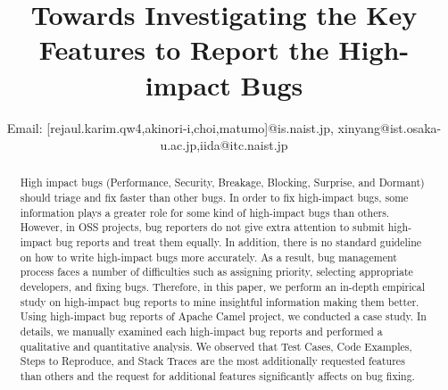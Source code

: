 \documentclass[conference]{IEEEtran}
\begin{document}
\title{Towards Investigating the Key Features to Report the High-impact Bugs }


\author{


Email: [rejaul.karim.qw4,akinori-i,choi,matumo]@is.naist.jp, xinyang@ist.osaka-u.ac.jp,iida@itc.naist.jp
}

\maketitle
\begin{abstract}

High impact bugs (Performance, Security, Breakage, Blocking, Surprise, and Dormant) should triage and fix faster than other bugs. In order to fix high-impact bugs, some information plays a greater role for some kind of high-impact bugs than others. However, in OSS projects, bug reporters do not give extra attention to submit high-impact bug reports and treat them equally. In addition,  there is no standard guideline on how to write high-impact bugs more accurately. As a result, bug management process faces a number of difficulties such as assigning priority, selecting appropriate developers, and fixing bugs. Therefore, in this paper, we perform an in-depth empirical study on high-impact bug reports to mine insightful information making them better. Using high-impact bug reports of Apache Camel project, we conducted a case study. In details, we manually examined each high-impact bug reports and performed a qualitative and quantitative analysis. We observed that Test Cases, Code Examples, Steps to Reproduce, and Stack Traces are the most additionally requested features than others and the request for additional features significantly affects on bug fixing.

\end{abstract}

\end{document}
